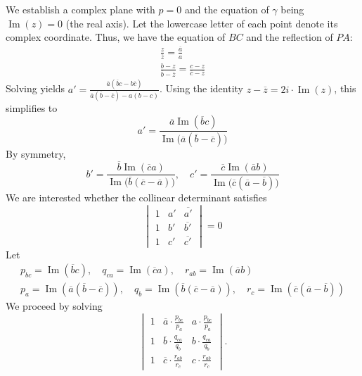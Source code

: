 \begin{enumerate}
We establish a complex plane with $p=0$ and the equation of $\gamma$ being $\operatorname{Im}(z)=0$ (the real axis). Let the lowercase letter of each point denote its complex coordinate. Thus, we have the equation of $BC$ and the reflection of $PA$:\begin{gather*}\frac{z}{\overline z}=\frac{\overline a}{a}\\\frac{b-z}{\overline b-\overline z}=\frac{c-z}{\overline c-\overline z}\end{gather*}Solving yields $a'=\frac{\overline{a}(\overline{b}c-b\overline{c})}{\overline{a}(\overline{b}-\overline{c})-a(b-c)}$. Using the identity $z-\overline{z}=2i\cdot \operatorname{Im}(z)$, this simplifies to
 \[a'=\frac{\overline{a}\operatorname{Im}(\overline{b}c)}{\operatorname{Im}\bigl(\overline{a}(\overline{b}-\overline{c})\bigr)}\]By symmetry,
 \[b'=\frac{\overline{b}\operatorname{Im}(\overline{c}a)}{\operatorname{Im}\bigl(\overline{b}(\overline{c}-\overline{a})\bigr)},\quad c'=\frac{\overline{c}\operatorname{Im}(\overline{a}b)}{\operatorname{Im}\bigl(\overline{c}(\overline{a}-\overline{b})\bigr)}\]We are interested whether the collinear determinant satisfies
 \[\begin{vmatrix} 1 & a' & \overline{a'} \\ 1 & b' & \overline{b'} \\ 1 & c' & \overline{c'} \end{vmatrix}=0\]Let \begin{gather*}p_{bc}=\operatorname{Im}(\overline b c),\quad q_{ca}=\operatorname{Im}(\overline c a), \quad r_{ab}=\operatorname{Im}(\overline a b)\\p_a=\operatorname{Im}(\overline a(\overline b-\overline c)),\quad q_b=\operatorname{Im}(\overline b(\overline c-\overline a)),\quad r_c=\operatorname{Im}(\overline c(\overline a-\overline b))\end{gather*} We proceed by solving 
 \[\begin{vmatrix} 1 & \overline a\cdot\frac{p_{bc}}{p_a} & a\cdot\frac{p_{bc}}{p_a} \\ 1 & \overline b\cdot\frac{q_{ca}}{q_b} & b\cdot\frac{q_{ca}}{q_b} \\ 1 & \overline c\cdot\frac{r_{ab}}{r_c} & c\cdot\frac{r_{ab}}{r_c} \end{vmatrix}.\]


\end{enumerate}
